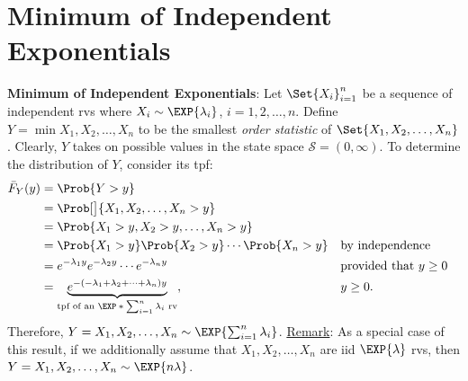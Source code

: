 \section*{Minimum of Independent Exponentials}
\begin{Regular}
    \textbf{Minimum of Independent Exponentials}: Let $ \Set{X_i}_{i=1}^n $ be a sequence of independent rvs where
    $ X_i \sim \EXP{\lambda_i} $, $ i=1,2,\ldots,n $. Define $ Y=\min{X_1,X_2,\ldots,X_n} $ to be the
    smallest \emph{order statistic} of $ \Set{X_1,X_2,\ldots,X_n} $. Clearly, $ Y $ takes on possible values
    in the state space $ \mathcal{S}=(0,\infty) $. To determine the distribution of $ Y $, consider its tpf:
    \begin{align*}
        \bar{F}_Y(y)
         & =\Prob{Y>y}                                                                                                                                                \\
         & =\Prob[\big]{\min{X_1,X_2,\ldots,X_n}>y}                                                                                                                   \\
         & =\Prob{X_1>y,X_2>y,\ldots,X_n>y}                                                                                                                           \\
         & =\Prob{X_1>y}\Prob{X_2>y}\cdots\Prob{X_n>y}                                                                           &  & \text{by independence}          \\
         & =e^{-\lambda_1y}e^{-\lambda_2y}\cdots e^{-\lambda_n y}                                                                &  & \text{provided that $ y\ge 0 $} \\
         & =\underbrace{e^{-(-\lambda_1+\lambda_2+\cdots+\lambda_n)y}}_{\text{tpf of an $ \EXP*{\sum_{i=1}^{n}\lambda_i} $ rv}}, &  & y\ge 0.
    \end{align*}
    Therefore, $ Y=\min{X_1,X_2,\ldots,X_n}\sim \EXP{\sum_{i=1}^{n}\lambda_i} $.
    \tcblower{}
    \underline{Remark}: As a special case of this result, if we additionally assume that $ X_1,X_2,\ldots,X_n $
    are iid $ \EXP{\lambda} $ rvs, then $ Y=\min{X_1,X_2,\ldots,X_n}\sim \EXP{n\lambda} $.
\end{Regular}
